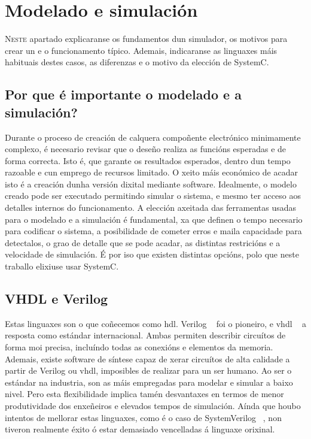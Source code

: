 \chapter{Modelado e simulación}
\label{chap:mod_sim}

\lettrine{N}{este} apartado explicaranse os fundamentos dun simulador, os motivos para crear un e o funcionamento típico. Ademais, indicaranse as linguaxes máis habituais destes casos, as diferenzas e o motivo da elección de SystemC. 

\section{Por que é importante o modelado e a simulación?}\label{sec:mod_sim}
Durante o proceso de creación de calquera compoñente electrónico minimamente complexo, é necesario revisar que o deseño realiza as funcións esperadas e de forma correcta. Isto é, que garante os resultados esperados, dentro dun tempo razoable e cun emprego de recursos limitado. O xeito máis económico de acadar isto é a creación dunha versión dixital mediante software. Idealmente, o modelo creado pode ser executado permitindo simular o sistema, e mesmo ter acceso aos detalles internos do funcionamento. A elección axeitada das ferramentas usadas para o modelado e a simulación é fundamental, xa que definen o tempo necesario para codificar o sistema, a posibilidade de cometer erros e maila capacidade para detectalos, o grao de detalle que se pode acadar, as distintas restricións e a velocidade de simulación. É por iso que existen distintas opcións, polo que neste traballo elixiuse usar SystemC.


\section{VHDL e Verilog}\label{sec:vhdl_verilog}
Estas linguaxes son o que coñecemos como \acrfull{hdl}. Verilog ~\cite{vhdl_verilog} foi o pioneiro, e \acrfull{vhdl} ~\cite{vhdl_verilog} a resposta como estándar internacional. Ambas permiten describir circuítos de forma moi precisa, incluíndo todas as conexións e elementos da memoria. Ademais, existe software de síntese capaz de xerar circuítos de alta calidade a partir de Verilog ou \acrshort{vhdl}, imposibles de realizar para un ser humano. Ao ser o estándar na industria, son as máis empregadas para modelar e simular a baixo nivel. Pero esta flexibilidade implica tamén desvantaxes en termos de menor produtividade dos enxeñeiros e elevados tempos de simulación. Aínda que houbo intentos de mellorar estas linguaxes, como é o caso de SystemVerilog ~\cite{system_verilog}, non tiveron realmente éxito ó estar demasiado vencelladas á linguaxe orixinal.

